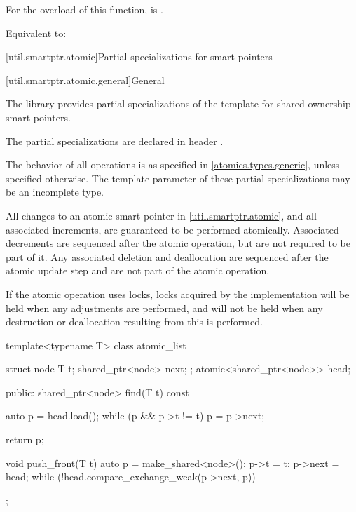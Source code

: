 \begin{itemdescr}
\pnum
\constraints
For the  overload of this function,
 is .

\pnum
\effects
Equivalent to: 
\end{itemdescr}

[util.smartptr.atomic]{Partial specializations for smart pointers}%
%

[util.smartptr.atomic.general]{General}

\pnum
The library provides partial specializations of the  template
for shared-ownership smart pointers.
\begin{note}
The partial specializations are declared in header .
\end{note}
The behavior of all operations is as specified in \ref{atomics.types.generic},
unless specified otherwise.
The template parameter  of these partial specializations
may be an incomplete type.

\pnum
All changes to an atomic smart pointer in \ref{util.smartptr.atomic}, and
all associated  increments,
are guaranteed to be performed atomically.
Associated  decrements
are sequenced after the atomic operation,
but are not required to be part of it.
Any associated deletion and deallocation
are sequenced after the atomic update step and
are not part of the atomic operation.
\begin{note}
If the atomic operation uses locks,
locks acquired by the implementation
will be held when any  adjustments are performed, and
will not be held when any destruction or deallocation
resulting from this is performed.
\end{note}

\pnum
\begin{example}
\begin{codeblock}
template<typename T> class atomic_list {
  struct node {
    T t;
    shared_ptr<node> next;
  };
  atomic<shared_ptr<node>> head;

public:
  shared_ptr<node> find(T t) const {
    auto p = head.load();
    while (p && p->t != t)
      p = p->next;

    return p;
  }

  void push_front(T t) {
    auto p = make_shared<node>();
    p->t = t;
    p->next = head;
    while (!head.compare_exchange_weak(p->next, p)) {}
  }
};
\end{codeblock}
\end{example}

